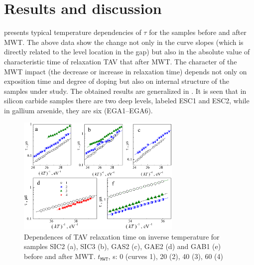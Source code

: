\documentclass[10pt]{iopart}
\begin{document}
\section{Results and discussion}\label{sec:Rez}

 presents typical temperature dependencies of $\tau$ for the samples before and after MWT.
The above data show the change not only in the curve slopes (which is directly related to the level location in the gap)
but also in the absolute value of  characteristic time of relaxation TAV that after MWT.
The character of the MWT impact (the decrease or increase in relaxation time) depends not only on exposition time and degree of doping but also on internal structure of the samples under study.
The obtained results are generalized in .
It is seen that in silicon carbide samples there are two deep levels, labeled ESC1 and ESC2, while in gallium arsenide, they are six (EGA1–EGA6).


\begin{figure}
\center
\includegraphics[width=0.7\textwidth]{Fig3}
\caption{\label{figTauTAV}
Dependences of TAV relaxation time on inverse temperature for samples SIC2 (a), SIC3 (b), GAS2 (c), GAE2 (d) and GAB1 (e) before and after MWT.
$t_\mathtt{MWT}$, s: 0 (curves 1), 20 (2), 40 (3), 60 (4)
}%
\end{figure}
\end{document}
